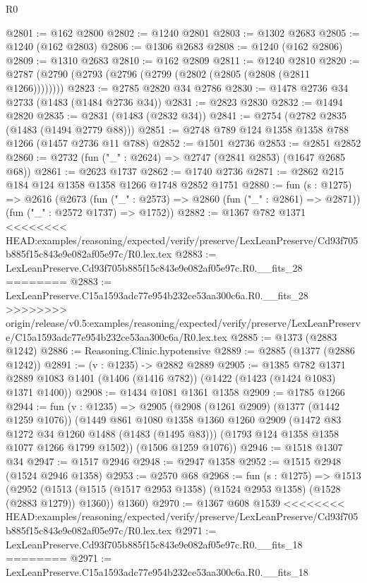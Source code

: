 \begin{lexlean}{R0}
\begin{coremodule}
{{{{{{{{{{{{{{{{{{{{{{{{{{{{{{{{{{{{{{{{{{{{{{{{{{{{{{{{{{{{{{{{{{{{{{{{{{{{{{{{{{{{{{@2801 := @162 @2800
@2802 := @1240 @2801
@2803 := @1302 @2683
@2805 := @1240 (@162 @2803)
@2806 := @1306 @2683
@2808 := @1240 (@162 @2806)
@2809 := @1310 @2683
@2810 := @162 @2809
@2811 := @1240 @2810
@2820 := @2787 (@2790 (@2793 (@2796 (@2799 (@2802 (@2805 (@2808 (@2811 @1266))))))))
@2823 := @2785 @2820 @34 @2786
@2830 := @1478 @2736 @34 @2733 (@1483 (@1484 @2736 @34))
@2831 := @2823 @2830
@2832 := @1494 @2820
@2835 := @2831 (@1483 (@2832 @34))
@2841 := @2754 (@2782 @2835 (@1483 (@1494 @2779 @88)))
@2851 := @2748 @789 @124 @1358 @1358 @788 @1266 (@1457 @2736 @11 @788)
@2852 := @1501 @2736
@2853 := @2851 @2852
@2860 := @2732 (fun ("_" : @2624) => @2747 (@2841 @2853) (@1647 @2685 @68))
@2861 := @2623 @1737
@2862 := @1740 @2736
@2871 := @2862 @215 @184 @124 @1358 @1358 @1266 @1748 @2852 @1751
@2880 := fun (s : @1275) =>
  @2616
    (@2673
      (fun ("_" : @2573) => @2860 (fun ("_" : @2861) => @2871))
      (fun ("_" : @2572 @1737) => @1752))
@2882 := @1367 @782 @1371
<<<<<<<< HEAD:examples/reasoning/expected/verify/preserve/LexLeanPreserve/Cd93f705b885f15c843e9e082af05e97c/R0.lex.tex
@2883 := LexLeanPreserve.Cd93f705b885f15c843e9e082af05e97c.R0.__fits_28
========
@2883 := LexLeanPreserve.C15a1593adc77e954b232ce53aa300c6a.R0.__fits_28
>>>>>>>> origin/release/v0.5:examples/reasoning/expected/verify/preserve/LexLeanPreserve/C15a1593adc77e954b232ce53aa300c6a/R0.lex.tex
@2885 := @1373 (@2883 @1242)
@2886 := Reasoning.Clinic.hypotensive
@2889 := @2885 (@1377 (@2886 @1242))
@2891 := (v : @1235) -> @2882 @2889
@2905 := @1385
    @782
    @1371
    @2889
    @1083
    @1401
    (@1406 (@1416 @782))
    (@1422 (@1423 (@1424 @1083) @1371 @1400))
@2908 := @1434 @1081 @1361 @1358
@2909 := @1785 @1266
@2944 := fun (v : @1235) =>
  @2905
    (@2908
      (@1261 @2909)
      (@1377 (@1442 @1259 @1076))
      (@1449
        @861
        @1080
        @1358
        @1360
        @1260
        @2909
        (@1472 @83 @1272 @34 @1260 @1488 (@1483 (@1495 @83)))
        (@1793 @124 @1358 @1358 @1077 @1266 @1799 @1502))
      (@1506 @1259 @1076))
@2946 := @1518 @1307 @34
@2947 := @1517 @2946
@2948 := @2947 @1358
@2952 := @1515 @2948 (@1524 @2946 @1358)
@2953 := @2570 @68
@2968 := fun (s : @1275) =>
  @1513
    (@2952
      (@1513 (@1515 (@1517 @2953 @1358) (@1524 @2953 @1358) (@1528 (@2883 @1279)) @1360))
      @1360)
@2970 := @1367 @608 @1539
<<<<<<<< HEAD:examples/reasoning/expected/verify/preserve/LexLeanPreserve/Cd93f705b885f15c843e9e082af05e97c/R0.lex.tex
@2971 := LexLeanPreserve.Cd93f705b885f15c843e9e082af05e97c.R0.__fits_18
========
@2971 := LexLeanPreserve.C15a1593adc77e954b232ce53aa300c6a.R0.__fits_18
}}}}}}}}}}}}}}}}}}}}}}}}}}}}}}}}}}}}}}}}}}}}}}}}}}}}}}}}}}}}}}}}}}}}}}}}}}}}}}}}}}}}}}
\end{coremodule}
\end{lexlean}
